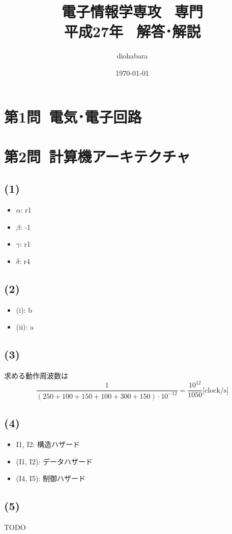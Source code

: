\documentclass[a4paper,12pt,xelatex,ja=standard]{bxjsarticle}
\title{電子情報学専攻 \, 専門 \\ 平成27年 \, 解答･解説}
\author{diohabara}
\date{\today}
\begin{document}
\maketitle

\section*{第1問\ 電気･電子回路}

\section*{第2問\ 計算機アーキテクチャ}
\subsection*{(1)}
\begin{itemize}
  \item $\alpha$: r1
  \item $\beta$: -1
  \item $\gamma$: r1
  \item $\delta$: r4
\end{itemize}

\subsection*{(2)}
\begin{itemize}
  \item (i): b
  \item (ii): a
\end{itemize}

\subsection*{(3)}
求める動作周波数は
\[
  \frac{1}{(250 + 100 + 150 + 100 + 300 + 150) \cdot 10^{-12}} = \frac{10^{12}}{1050}\text{[clock/s]}
\]

\subsection*{(4)}
\begin{itemize}
  \item I1, I2: 構造ハザード
  \item (I1, I2): データハザード
  \item (I4, I5): 制御ハザード
\end{itemize}

\subsection*{(5)}
TODO
\end{document}
